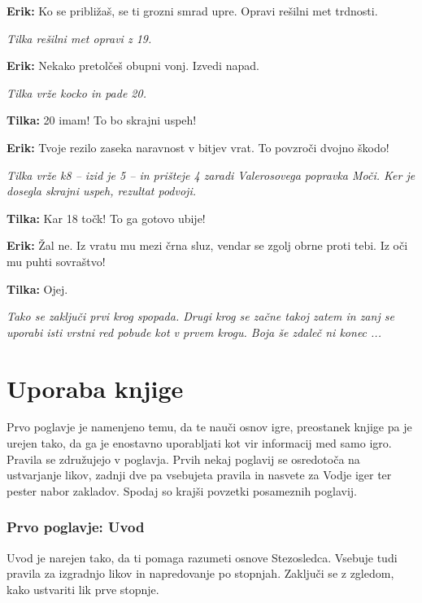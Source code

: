 \textbf{Erik:} Ko se približaš, se ti grozni smrad upre. Opravi rešilni met trdnosti.

\vspace{20pt}
\textit{Tilka rešilni met opravi z 19.}
\vspace{20pt}

\textbf{Erik:} Nekako pretolčeš obupni vonj. Izvedi napad.

\vspace{20pt}
\textit{Tilka vrže kocko in pade 20.}
\vspace{20pt}

\textbf{Tilka:} 20 imam! To bo skrajni uspeh!

\textbf{Erik:} Tvoje rezilo zaseka naravnost v bitjev vrat. To povzroči dvojno škodo!

\vspace{20pt}
\textit{Tilka vrže k8 -- izid je 5 -- in prišteje 4 zaradi Valerosovega popravka Moči. Ker je dosegla skrajni uspeh, rezultat podvoji.}
\vspace{20pt}

\textbf{Tilka:} Kar 18 točk! To ga gotovo ubije!

\textbf{Erik:} Žal ne. Iz vratu mu mezi črna sluz, vendar se zgolj obrne proti tebi. Iz oči mu puhti sovraštvo!

\textbf{Tilka:} Ojej.

\vspace{20pt}
\textit{Tako se zaključi prvi krog spopada. Drugi krog se začne takoj zatem in zanj se uporabi isti vrstni red pobude kot v prvem krogu. Boja še zdaleč ni konec ...}
\vspace{20pt}

\section{Uporaba knjige}
Prvo poglavje je namenjeno temu, da te nauči osnov igre, preostanek knjige pa je urejen tako, da ga je enostavno uporabljati kot vir informacij med samo igro. Pravila se združujejo v poglavja. Prvih nekaj poglavij se osredotoča na ustvarjanje likov, zadnji dve pa vsebujeta pravila in nasvete za Vodje iger ter pester nabor zakladov. Spodaj so krajši povzetki posameznih poglavij.

\subsubsection{Prvo poglavje: Uvod}
Uvod je narejen tako, da ti pomaga razumeti osnove Stezosledca. Vsebuje tudi pravila za izgradnjo likov in napredovanje po stopnjah. Zaključi se z zgledom, kako ustvariti lik prve stopnje.

